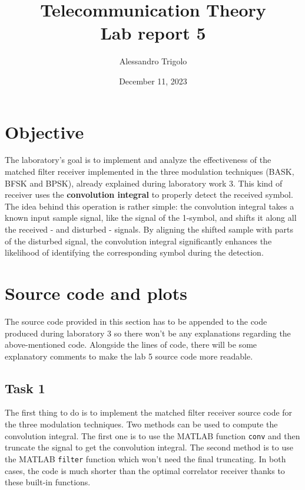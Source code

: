 \title{\vspace{160px} \textbf{\huge{Telecommunication Theory}} \\\vspace{17.5px} \LARGE{Lab report 5}  \vspace{10px}}
\author{Alessandro Trigolo}
\date{December 11, 2023}


\maketitle \newpage

\section*{Objective}
The laboratory’s goal is to implement and analyze the effectiveness of the matched filter receiver implemented in the three modulation techniques (BASK, BFSK and BPSK), already explained during laboratory work 3. This kind of receiver uses the \textbf{convolution integral} to properly detect the received symbol. The idea behind
this operation is rather simple: the convolution integral takes a known input sample signal, like the signal of the 1-symbol, and shifts it along all the received - and disturbed - signals. By aligning the shifted sample with parts of the disturbed signal, the convolution integral significantly enhances the likelihood of identifying the corresponding symbol during the detection.


\lstset{style = MATLAB}
\section*{Source code and plots}
The source code provided in this section has to be appended to the code produced during laboratory 3 so there won't be any explanations regarding the above-mentioned code. Alongside the lines of code, there will be some explanatory comments to make the lab 5 source code more readable.

\subsection*{Task 1}
The first thing to do is to implement the matched filter receiver source code for the three modulation techniques. Two methods can be used to compute the convolution integral. The first one is to use the MATLAB function \texttt{conv} and then truncate the signal to get the convolution integral. The second method is to use the MATLAB \texttt{filter} function which won't need the final truncating. In both cases, the code is much shorter than the optimal correlator receiver thanks to these built-in functions.

